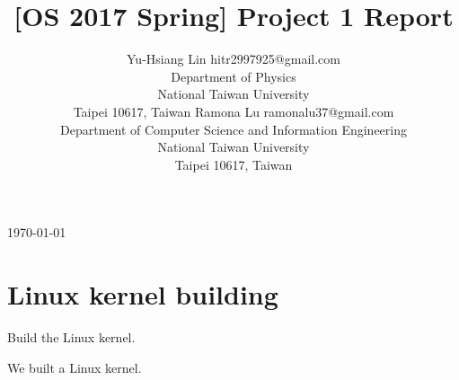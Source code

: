 \documentclass[twoside, 11pt, tablecaption=bottom]{article}
\begin{document}
\today

\title{[OS 2017 Spring] Project 1 Report}

\author{%
	\name Yu-Hsiang Lin \email hitr2997925@gmail.com \\
	\addr Department of Physics\\
	National Taiwan University\\
	Taipei 10617, Taiwan
	\AND
	\name Ramona Lu \email ramonalu37@gmail.com \\
	\addr Department of Computer Science and Information Engineering\\
	National Taiwan University\\
	Taipei 10617, Taiwan
}


\maketitle










\section{Linux kernel building}

	Build the Linux kernel.
	
	We built a Linux kernel.




\vskip 0.2in
%
\end{document}
